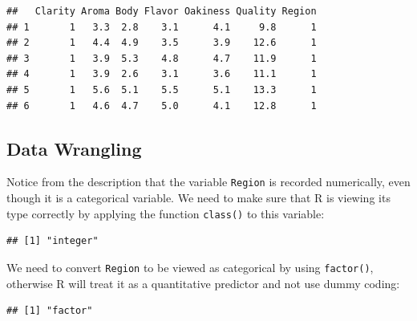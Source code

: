 \documentclass[
]{book}
\newenvironment{Shaded}{\begin{snugshade}}{\end{snugshade}}
\newcommand{\DocumentationTok}[1]{\textcolor[rgb]{0.56,0.35,0.01}{\textbf{\textit{#1}}}}
\newcommand{\FunctionTok}[1]{\textcolor[rgb]{0.13,0.29,0.53}{\textbf{#1}}}
\newcommand{\NormalTok}[1]{#1}
\newcommand{\OtherTok}[1]{\textcolor[rgb]{0.56,0.35,0.01}{#1}}
\newcommand{\SpecialCharTok}[1]{\textcolor[rgb]{0.81,0.36,0.00}{\textbf{#1}}}
\begin{document}
\begin{verbatim}
##   Clarity Aroma Body Flavor Oakiness Quality Region
## 1       1   3.3  2.8    3.1      4.1     9.8      1
## 2       1   4.4  4.9    3.5      3.9    12.6      1
## 3       1   3.9  5.3    4.8      4.7    11.9      1
## 4       1   3.9  2.6    3.1      3.6    11.1      1
## 5       1   5.6  5.1    5.5      5.1    13.3      1
## 6       1   4.6  4.7    5.0      4.1    12.8      1
\end{verbatim}

\hypertarget{data-wrangling}{%
\subsection*{Data Wrangling}\label{data-wrangling}}

Notice from the description that the variable \texttt{Region} is recorded numerically, even though it is a categorical variable. We need to make sure that R is viewing its type correctly by applying the function \texttt{class()} to this variable:

\begin{Shaded}
\end{Shaded}

\begin{verbatim}
## [1] "integer"
\end{verbatim}

We need to convert \texttt{Region} to be viewed as categorical by using \texttt{factor()}, otherwise R will treat it as a quantitative predictor and not use dummy coding:

\begin{Shaded}
\end{Shaded}

\begin{verbatim}
## [1] "factor"
\end{verbatim}
\end{document}
